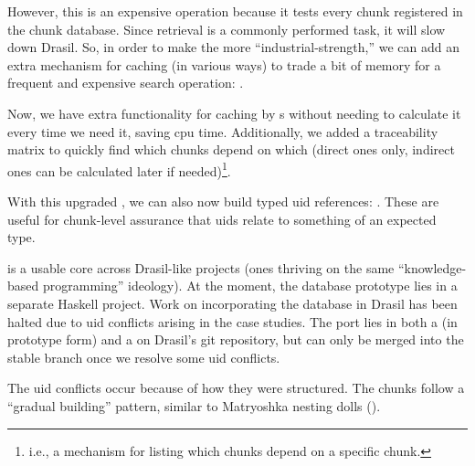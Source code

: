 \pseudoGrabAllChunksFromNewChunkDB{}

However, this is an expensive operation because it tests every chunk registered
in the chunk database. Since retrieval is a commonly performed task, it will
slow down Drasil. So, in order to make the \ChunkDB{} more
``industrial-strength,'' we can add an extra mechanism for caching (in various
ways) to trade a bit of memory for a frequent and expensive search operation:
.

\protoChunkDBHaskell{}

Now, we have extra functionality for caching by \TypeRep{}s without needing to
calculate it every time we need it, saving \acs{cpu} time. Additionally, we
added a traceability matrix to quickly find which chunks depend on which (direct
ones only, indirect ones can be calculated later if needed)\footnote{i.e., a
mechanism for listing which chunks depend on a specific chunk.}.

\protoTypedUIDHaskell{}

With this upgraded \ChunkDB{}, we can also now build typed \acs{uid} references:
. These are useful for chunk-level assurance that
\acsp{uid} relate to something of an expected type.

\ChunkDB{} is a usable core across Drasil-like projects (ones thriving on the
same ``knowledge-based programming'' ideology). At the moment, the database
prototype lies in a separate Haskell project. Work on incorporating the database
in Drasil has been halted due to \acs{uid} conflicts arising in the case
studies. The port lies in both a  (in prototype form) and a
 on Drasil's git
repository, but can only be merged into the stable branch once we resolve some
\acs{uid} conflicts.

\matryoshkaDollsImg{}

The \acs{uid} conflicts occur because of how they were structured. The chunks
follow a ``gradual building'' pattern, similar to Matryoshka nesting
dolls ().

\pseudoChunkNestingHaskell{}

